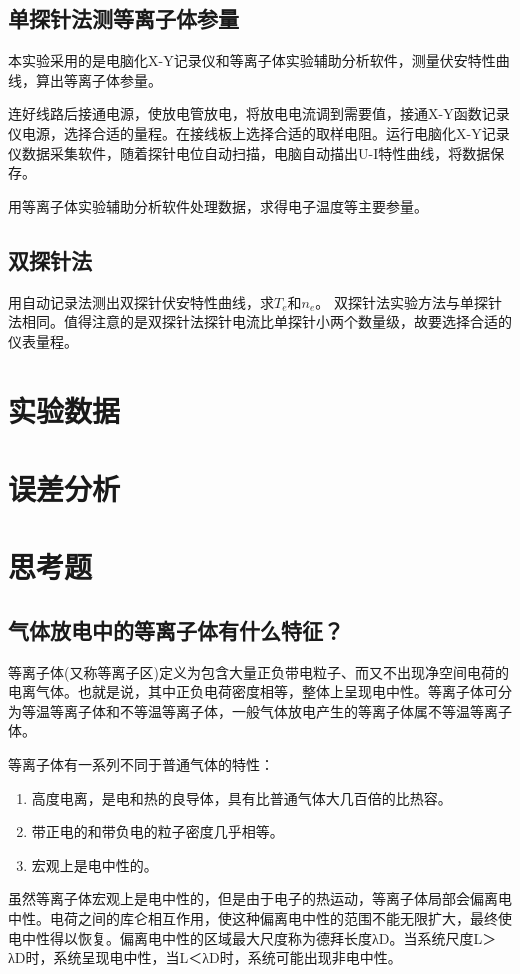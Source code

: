\documentclass[a4paper]{article}
\begin{document}
\subsection{单探针法测等离子体参量}
本实验采用的是电脑化X-Y记录仪和等离子体实验辅助分析软件，测量伏安特性曲线，算出等离子体参量。

连好线路后接通电源，使放电管放电，将放电电流调到需要值，接通X-Y函数记录仪电源，选择合适的量程。在接线板上选择合适的取样电阻。运行电脑化X-Y记录仪数据采集软件，随着探针电位自动扫描，电脑自动描出U-I特性曲线，将数据保存。

用等离子体实验辅助分析软件处理数据，求得电子温度等主要参量。
\subsection{双探针法}
用自动记录法测出双探针伏安特性曲线，求$T_e$和$n_e$。
双探针法实验方法与单探针法相同。值得注意的是双探针法探针电流比单探针小两个数量级，故要选择合适的仪表量程。

\section{实验数据}

\section{误差分析}

\section{思考题}
\subsection{气体放电中的等离子体有什么特征？}
等离子体(又称等离子区)定义为包含大量正负带电粒子、而又不出现净空间电荷的电离气体。也就是说，其中正负电荷密度相等，整体上呈现电中性。等离子体可分为等温等离子体和不等温等离子体，一般气体放电产生的等离子体属不等温等离子体。

等离子体有一系列不同于普通气体的特性：
\begin{enumerate}
\item 高度电离，是电和热的良导体，具有比普通气体大几百倍的比热容。
\item 带正电的和带负电的粒子密度几乎相等。
\item 宏观上是电中性的。
\end{enumerate}
虽然等离子体宏观上是电中性的，但是由于电子的热运动，等离子体局部会偏离电中性。电荷之间的库仑相互作用，使这种偏离电中性的范围不能无限扩大，最终使电中性得以恢复。偏离电中性的区域最大尺度称为德拜长度λD。当系统尺度L＞λD时，系统呈现电中性，当L＜λD时，系统可能出现非电中性。
\end{document}
